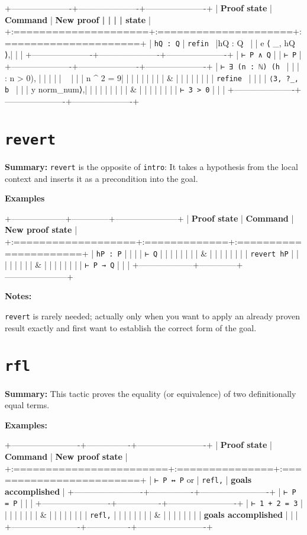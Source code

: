 \documentclass{memoir}
\begin{document}
+----------------------+----------------------+----------------------+
| \textbf{Proof state} | \textbf{Command} | \textbf{New proof |
| | | state} |
+:=====================+:=====================+:=====================+
| \Verb|hQ : Q| | \Verb|refin | |hQ : Q\Verb| |
| | e ⟨ _, hQ ⟩,| | |
+----------------------+----------------------+----------------------+
| \Verb|⊢ P ∧ Q| | | \Verb|⊢ P| |
+----------------------+----------------------+----------------------+
| \Verb|⊢ ∃ (n : ℕ) (h | | |
| : n > 0), | | | |
| \Verb| | | |
| n ^ 2 = 9| | | |
| | | |
| & | | |
| | | |
| \Verb|refine | | | |
| \Verb|⟨3, ?_, b | | |
| y norm_num⟩,| | | |
| | | |
| & | | |
| | | |
| \Verb|⊢ 3 > 0| | | |
+----------------------+----------------------+----------------------+




\section{\Verb|revert|}

\textbf{Summary:} \Verb|revert| is the opposite of \Verb|intro|: It takes a hypothesis from the local context and inserts it as a precondition into the goal.

\textbf{Examples}

+--------------------+--------------+-----------------------+
| \textbf{Proof state} | \textbf{Command} | \textbf{New proof state} |
+:===================+:=============+:======================+
| \Verb|hP : P| | | |
| \Verb|⊢ Q| | | |
| | | |
| & | | |
| | | |
| \Verb|revert hP| | | |
| | | |
| & | | |
| | | |
| \Verb|⊢ P → Q| | | |
+--------------------+--------------+-----------------------+

\textbf{Notes:}

\Verb|revert| is rarely needed; actually only when you want to apply an already proven result exactly and first want to establish the correct form of the goal.




\section{\Verb|rfl|}

\textbf{Summary:} This tactic proves the equality (or equivalence) of two definitionally equal terms.

\textbf{Examples:}

+-------------------------+----------------+-------------------------+
| \textbf{Proof state} | \textbf{Command} | \textbf{New proof state} |
+:========================+:===============+:========================+
| \Verb|⊢ P ↔ P| or | \Verb|refl,| | \textbf{goals accomplished} |
+-------------------------+----------------+-------------------------+
| \Verb|⊢ P = P| | | |
+-------------------------+----------------+-------------------------+
| \Verb|⊢ 1 + 2 = 3| | | |
| | | |
| & | | |
| | | |
| \Verb|refl,| | | |
| | | |
| & | | |
| | | |
| \textbf{goals accomplished} | | |
+-------------------------+----------------+-------------------------+
\end{document}
